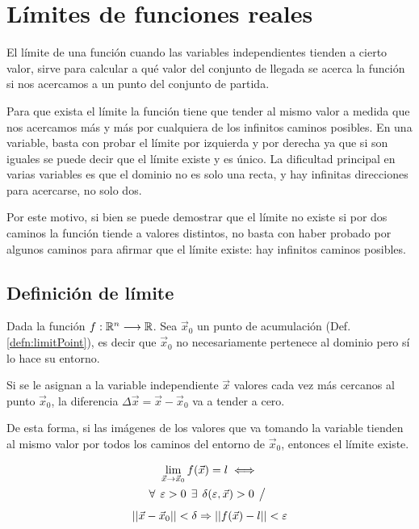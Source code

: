 \chapter{Límites de funciones reales}

El límite de una función cuando las variables independientes tienden a cierto valor, sirve para calcular a qué valor del conjunto de llegada se acerca la función si nos acercamos a un punto del conjunto de partida.

Para que exista el límite la función tiene que tender al mismo valor a medida que nos acercamos más y más por cualquiera de los infinitos caminos posibles.
En una variable, basta con probar el límite por izquierda y por derecha ya que si son iguales se puede decir que el límite existe y es único.
La dificultad principal en varias variables es que el dominio no es solo una recta, y hay infinitas direcciones para acercarse, no solo dos.

Por este motivo, si bien se puede demostrar que el límite no existe si por dos caminos la función tiende a valores distintos, no basta con haber probado por algunos caminos para afirmar que el límite existe: hay infinitos caminos posibles.


\section{Definición de límite}

Dada la función $f:\mathbb{R}^n \longrightarrow \mathbb{R}$.
Sea $\Vec{x}_0$ un punto de acumulación (Def. \ref{defn:limitPoint}), es decir que $\Vec{x}_0$ no necesariamente pertenece al dominio pero sí lo hace su entorno.

Si se le asignan a la variable independiente $\Vec{x}$ valores cada vez más cercanos al punto $\Vec{x}_0$, la diferencia $\Delta \Vec{x} = \Vec{x}-\Vec{x}_0$ va a tender a cero.

De esta forma, si las imágenes de los valores que va tomando la variable tienden al mismo valor por todos los caminos del entorno de $\Vec{x}_0$, entonces el límite existe.

\begin{mdframed}[style=DefinitionFrame]
    \begin{defn}
    \end{defn}
    \begin{gather*}
        \lim_{\Vec{x} \to \Vec{x}_0} f(\Vec{x})=l \iff
        \\
        \forall \hspace{1ex} \varepsilon >0 \hspace{1ex} \exists \hspace{1ex} \delta(\varepsilon,\Vec{x})>0 \hspace{1ex} \big/ \hspace{1ex}
        \\[1ex]
        {\left|\left| { \Vec{x}-\Vec{x}_0 } \right|\right|} < \delta \Rightarrow {\left|\left| { f(\Vec{x})-l } \right|\right|} < \varepsilon
    \end{gather*}
\end{mdframed}


